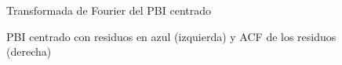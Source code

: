 \documentclass[a4paper]{article}
\begin{document}
\begin{figure}[H]
	\centering
	\caption{Transformada de Fourier del PBI centrado} 	
	\label{fig:PBI_cntr_fft}
\end{figure}

\begin{figure}[H]
	\centering
	\caption{PBI centrado con residuos en azul (izquierda) y ACF de los residuos (derecha)}
	\label{fig:PBI_fft_resid}
\end{figure}


\end{document}
